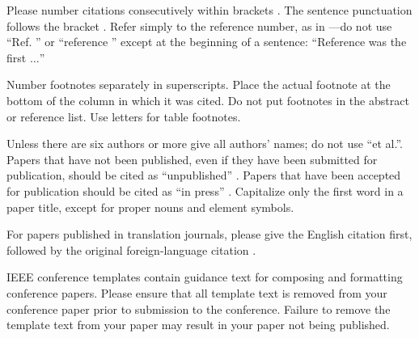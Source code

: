 \documentclass[conference]{IEEEtran}
\begin{document}
Please number citations consecutively within brackets \cite{b1}. The 
sentence punctuation follows the bracket \cite{b2}. Refer simply to the reference 
number, as in \cite{b3}---do not use ``Ref. \cite{b3}'' or ``reference \cite{b3}'' except at 
the beginning of a sentence: ``Reference \cite{b3} was the first $\ldots$''

Number footnotes separately in superscripts. Place the actual footnote at 
the bottom of the column in which it was cited. Do not put footnotes in the 
abstract or reference list. Use letters for table footnotes.

Unless there are six authors or more give all authors' names; do not use 
``et al.''. Papers that \cite{b8} have not been published, even if they have been 
submitted for publication, should be cited as ``unpublished'' \cite{b4}. Papers 
that have been accepted for publication should be cited as ``in press'' \cite{b5}. 
Capitalize only the \cite{b11}  first word \cite{b9} in a paper title, except for proper nouns and 
element symbols.

For papers published in translation journals, please give the English \cite{b10}
citation first, followed by the original foreign-language citation \cite{b6}.



\vspace{12pt}
\color{red}
IEEE conference templates contain guidance text for composing and formatting conference papers. Please ensure that all template text is removed from your conference paper prior to submission to the conference. Failure to remove the template text from your paper may result in your paper not being published.
\end{document}
